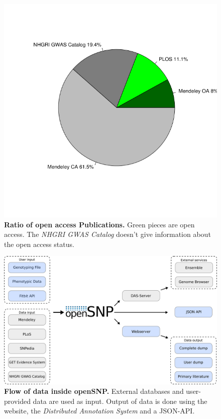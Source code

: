 \documentclass[10pt]{article}
\begin{document}
\begin{figure}[!ht]
	\begin{center}
		\includegraphics[scale=0.6]{25_10_2012_Graphs/new_pie.png}
	\end{center}
	\caption{
	{\bf Ratio of open access Publications.} Green pieces are open access. The \emph{NHGRI GWAS Catalog} doesn't give information about the open access status.}
	\label{oa_label}
\end{figure}

\begin{figure}[!ht]
	\begin{center}
	  \includegraphics[scale=0.3]{latest_uml.png}
	\end{center}
	\caption{
	{\bf Flow of data inside openSNP.} External databases and user-provided data are used as input. Output of data is done using the website, the \emph{Distributed Annotation System} and a JSON-API.} 
	\label{Figure4_label}
\end{figure}
\end{document}
